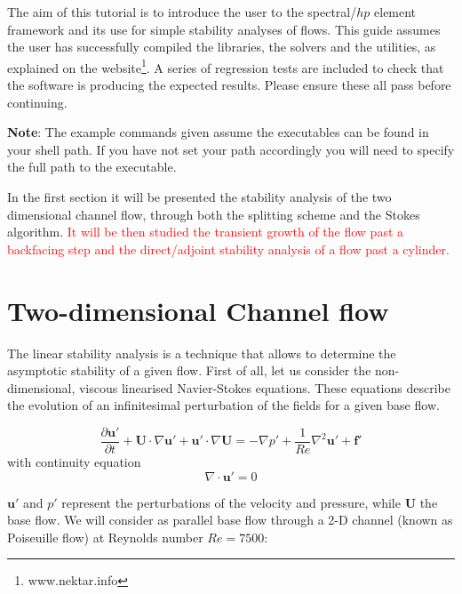 \documentclass[a4paper,12pt]{article}
\begin{document}
\maketitle

The aim of this tutorial is to introduce the user to the spectral/$hp$
element framework \nektar and its use for simple stability analyses of flows. This guide assumes
the user has successfully compiled the libraries, the solvers and the utilities,
as explained on the website\footnote{www.nektar.info}. A series of regression
tests are included to check that the software is producing the expected results.
Please ensure these all pass before continuing.

\textbf{Note}: The example commands given assume the \nektar executables can be
found in your shell path. If you have not set your path accordingly you will
need to specify the full path to the \nektar executable.
\bigskip

In the first section it will be presented the stability analysis of the two dimensional channel flow,
through both the splitting scheme and the Stokes algorithm.\textcolor{red}{ It will be then studied the transient growth
of the flow past a backfacing step and the direct/adjoint stability analysis of a flow past a cylinder.}

\section{Two-dimensional Channel flow}

The linear stability analysis is a technique that allows to determine the asymptotic stability of a given flow.
First of all, let us consider the non-dimensional, viscous linearised Navier-Stokes equations. These equations describe the evolution of an infinitesimal perturbation of the fields for a given base flow.

\begin{equation} \label{perturbationeqns}
\frac{\partial \mathbf{u'}}{\partial t} + \mathbf{U} \cdot \nabla{\mathbf{u'}} + \mathbf{u'} \cdot \nabla{\mathbf{U}}  =-\nabla p' + \frac{1}{Re}\nabla^{2} \mathbf{u'}+\mathbf{f'}
\end{equation}
with continuity equation
\begin{equation}
\nabla \cdot \mathbf{u'}=0
\end{equation}

$\mathbf{u'}$ and $p'$ represent the perturbations of the velocity and pressure, while $\mathbf{U}$ the base flow. 
We will consider as parallel base flow through a 2-D channel (known as Poiseuille flow) at Reynolds number $Re=7500$:
\end{document}
